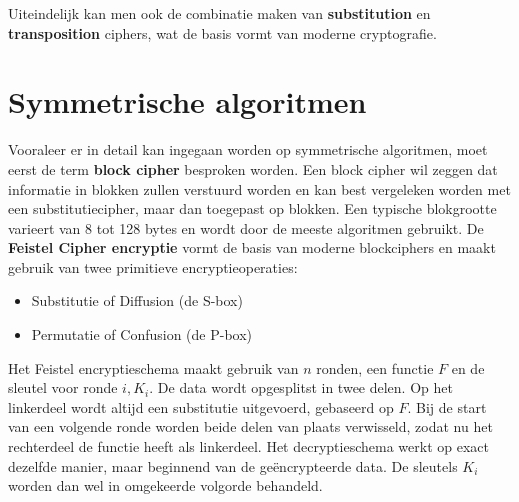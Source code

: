 \documentclass{report}
\begin{document}
	Uiteindelijk kan men ook de combinatie maken van \textbf{substitution} en \textbf{transposition} ciphers, wat de basis vormt van moderne cryptografie.

	\section{Symmetrische algoritmen}
	Vooraleer er in detail kan ingegaan worden op symmetrische algoritmen, moet eerst de term \textbf{block cipher} besproken worden. Een block cipher wil zeggen dat informatie in blokken zullen verstuurd worden en kan best vergeleken worden met een substitutiecipher, maar dan toegepast op blokken. Een typische blokgrootte varieert van 8 tot 128 bytes en wordt door de meeste algoritmen gebruikt. De \textbf{Feistel Cipher encryptie} vormt de basis van moderne blockciphers en maakt gebruik van twee primitieve encryptieoperaties:
	\begin{itemize}
		\item Substitutie of Diffusion (de S-box)
		\item Permutatie of Confusion (de P-box)
	\end{itemize}
	Het Feistel encryptieschema maakt gebruik van $n$ ronden, een functie $F$ en de sleutel voor ronde $i, K_i$. De data wordt opgesplitst in twee delen. Op het linkerdeel wordt altijd een substitutie uitgevoerd, gebaseerd op $F$. Bij de start van een volgende ronde worden beide delen van plaats verwisseld, zodat nu het rechterdeel de functie heeft als linkerdeel. Het decryptieschema werkt op exact dezelfde manier, maar beginnend van de geëncrypteerde data. De sleutels $K_i$ worden dan wel in omgekeerde volgorde behandeld.
\end{document}
